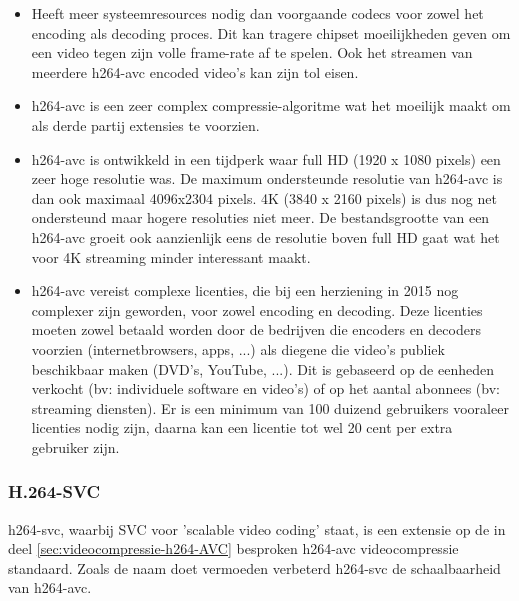 \begin{itemize}
	
	\item Heeft meer systeemresources nodig dan voorgaande \glspl{codec} voor zowel het \gls{encoding} als \gls{decoding} proces. Dit kan tragere chipset moeilijkheden geven om een video tegen zijn volle \gls{frame-rate} af te spelen. Ook het streamen van meerdere \gls{h264-avc} encoded video's kan zijn tol eisen.
	
	\item \Gls{h264-avc} is een zeer complex \gls{compressie-algoritme} wat het moeilijk maakt om als derde partij extensies te voorzien.
	
	\item \Gls{h264-avc} is ontwikkeld in een tijdperk waar full HD (1920 x 1080 \glspl{pixel}) een zeer hoge resolutie was. De maximum ondersteunde resolutie van \gls{h264-avc} is dan ook maximaal 4096x2304 \glspl{pixel}. 4K (3840 x 2160 \glspl{pixel}) is dus nog net ondersteund maar hogere resoluties niet meer. De bestandsgrootte van een \gls{h264-avc} groeit ook aanzienlijk eens de resolutie boven full HD gaat wat het voor 4K streaming minder interessant maakt.
	
	\item \Gls{h264-avc} vereist complexe licenties, die bij een herziening in 2015 nog complexer zijn geworden, voor zowel \gls{encoding} en \gls{decoding}. Deze licenties moeten zowel betaald worden door de bedrijven die \glspl{encoder} en \glspl{decoder} voorzien (internetbrowsers, apps, ...) als diegene die video's publiek beschikbaar maken (DVD's, YouTube, ...). Dit is gebaseerd op de eenheden verkocht (bv: individuele software en video's) of op het aantal abonnees (bv: streaming diensten). Er is een minimum van 100 duizend gebruikers vooraleer licenties nodig zijn, daarna kan een licentie tot wel 20 cent per extra gebruiker zijn.
	
\end{itemize}

\subsubsection{H.264-SVC}
\label{sec:videocompressie-h264-SVC}

\Gls{h264-svc}, waarbij SVC voor 'scalable video coding' staat, is een extensie op de in deel \ref{sec:videocompressie-h264-AVC} besproken \gls{h264-avc} \gls{videocompressie} standaard. Zoals de naam doet vermoeden verbeterd \gls{h264-svc} de schaalbaarheid van \gls{h264-avc}.

